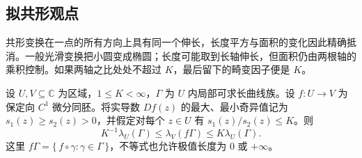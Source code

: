 \subsection{拟共形观点}
\label{b3:subsec:080405}

共形变换在一点的所有方向上具有同一个伸长，长度平方与面积的变化因此精确抵消。一般光滑变换把小圆变成椭圆；长度可能取到长轴伸长，但面积仍由两根轴的乘积控制。如果两轴之比处处不超过 \(K\)，最后留下的畸变因子便是 \(K\)。

\begin{proposition}[光滑拟共形映射的极值长度畸变]\label{b3:prop:08-smooth-quasiconformal-distortion}
设 \(U,V\subseteq\mathbb C\) 为区域，\(1\le K<\infty\)，\(\Gamma\) 为 \(U\) 内局部可求长曲线族。设 \(f:U\rightarrow V\) 为保定向 \(C^1\) 微分同胚。将实导数 \(Df(z)\) 的最大、最小奇异值记为 \(s_1(z)\ge s_2(z)>0\)，并假定对每个 \(z\in U\) 有 \(s_1(z)/s_2(z)\le K\)。则
\[
 K^{-1}\lambda_U(\Gamma)
 \le\lambda_V(f\Gamma)
 \le K\lambda_U(\Gamma).
\]
这里 \(f\Gamma=\{\,f\circ\gamma:\gamma\in\Gamma\,\}\)，不等式也允许极值长度为 \(0\) 或 \(+\infty\)。
\end{proposition}
